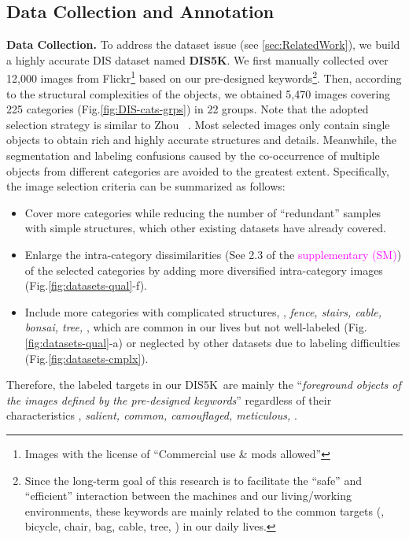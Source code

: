 \documentclass[10pt,twocolumn,letterpaper]{article}
\newcommand{\figref}[1]{Fig.\ref{#1}}
\newcommand{\secref}[1]{\ref{#1}}
\newcommand{\supp}[1]{\textcolor{magenta}{#1}}
\def \ourdataset{DIS5K}
\begin{document}
\subsection{Data Collection and Annotation}\label{sec:DataCol}
\textbf{Data Collection.} To address the dataset issue (see \secref{sec:RelatedWork}), we build a highly accurate DIS dataset named \textbf{\ourdataset}. We first manually collected over 12,000 images from Flickr\footnote{Images with the license of ``Commercial use \& mods allowed''} based on our pre-designed keywords\footnote{Since the long-term goal of this research is to facilitate the ``safe'' and ``efficient'' interaction between the machines and our living/working environments, these keywords are mainly related to the common targets (\eg, bicycle, chair, bag, cable, tree, \etc) in our daily lives.}. 
Then, according to the structural complexities of the objects, 
we obtained 5,470 images covering 225 categories (\figref{fig:DIS-cats-grps}) 
in 22 groups. Note that the adopted selection strategy is similar to Zhou \etal~\cite{zhou2017places}. Most selected images only contain single objects to obtain rich and highly accurate structures and details. Meanwhile, the segmentation and labeling confusions caused by the co-occurrence of multiple objects from different categories are avoided to the greatest extent. Specifically, the image selection criteria can be summarized as follows: 
\begin{itemize}
    \item[] Cover more categories while reducing the number of ``redundant'' samples with simple structures, which other existing datasets have already covered.
    
    \item[] Enlarge the intra-category dissimilarities (See 2.3 of the \supp{supplementary (SM)}) of the selected categories by adding more diversified intra-category images 
    (\figref{fig:datasets-qual}-f). 
    
    \item[] Include more categories with complicated structures, \eg, \textit{fence, stairs, cable, bonsai, tree,} \etc, which are common in our lives but not well-labeled 
    (\figref{fig:datasets-qual}-a) or neglected by other datasets due to labeling difficulties (\figref{fig:datasets-cmplx}). 
\end{itemize}

Therefore, the labeled targets in our \ourdataset~are mainly the ``\textit{foreground objects of the images defined by the pre-designed keywords}'' regardless of their characteristics \eg, \textit{salient, common, camouflaged, meticulous,} \etc. 
\end{document}
